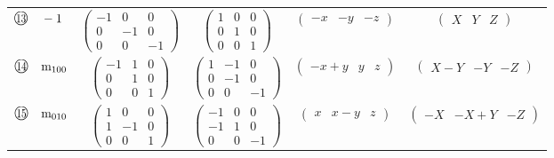 \documentclass[fleqn,10pt,landscape]{jsarticle}
\begin{document}
\begin{center}
\begin{longtable}{lcccc}
$ {\ooalign{\hfil\resizebox{.8\width}{\height}{13}\hfil\crcr\raise.1ex\hbox{\large$\bigcirc$}}}\quad -1 $ & $ \begin{pmatrix} -1 & 0 & 0 \\ 0 & -1 & 0 \\ 0 & 0 & -1 \end{pmatrix} $ & $ \begin{pmatrix} 1 & 0 & 0 \\ 0 & 1 & 0 \\ 0 & 0 & 1 \end{pmatrix} $ & $ \begin{pmatrix} - x & - y & - z \end{pmatrix} $ & $ \begin{pmatrix} X & Y & Z \end{pmatrix} $ \\
$ {\ooalign{\hfil\resizebox{.8\width}{\height}{14}\hfil\crcr\raise.1ex\hbox{\large$\bigcirc$}}}\quad {\rm m}_{100} $ & $ \begin{pmatrix} -1 & 1 & 0 \\ 0 & 1 & 0 \\ 0 & 0 & 1 \end{pmatrix} $ & $ \begin{pmatrix} 1 & -1 & 0 \\ 0 & -1 & 0 \\ 0 & 0 & -1 \end{pmatrix} $ & $ \begin{pmatrix} - x + y & y & z \end{pmatrix} $ & $ \begin{pmatrix} X - Y & - Y & - Z \end{pmatrix} $ \\
$ {\ooalign{\hfil\resizebox{.8\width}{\height}{15}\hfil\crcr\raise.1ex\hbox{\large$\bigcirc$}}}\quad {\rm m}_{010} $ & $ \begin{pmatrix} 1 & 0 & 0 \\ 1 & -1 & 0 \\ 0 & 0 & 1 \end{pmatrix} $ & $ \begin{pmatrix} -1 & 0 & 0 \\ -1 & 1 & 0 \\ 0 & 0 & -1 \end{pmatrix} $ & $ \begin{pmatrix} x & x - y & z \end{pmatrix} $ & $ \begin{pmatrix} - X & - X + Y & - Z \end{pmatrix} $ \\

\end{longtable}
\end{center}
\end{document}
